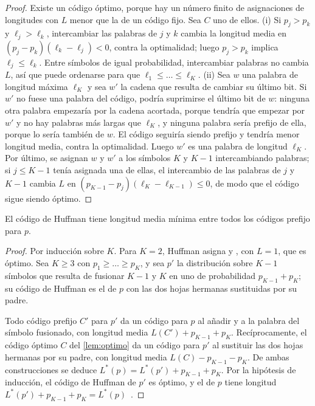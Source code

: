 \begin{proof}
Existe un código óptimo, porque hay un número finito de asignaciones de longitudes con $L$ menor que la de un código fijo. Sea $C$ uno de ellos. (i) Si $p_j>p_k$ y $\ell_j>\ell_k$, intercambiar las palabras de $j$ y $k$ cambia la longitud media en $(p_j-p_k)(\ell_k-\ell_j)<0$, contra la optimalidad; luego $p_j>p_k$ implica $\ell_j\le\ell_k$. Entre símbolos de igual probabilidad, intercambiar palabras no cambia $L$, así que puede ordenarse para que $\ell_1\le\dots\le\ell_K$. (ii) Sea $w$ una palabra de longitud máxima $\ell_K$ y sea $w'$ la cadena que resulta de cambiar su último bit. Si $w'$ no fuese una palabra del código, podría suprimirse el último bit de $w$: ninguna otra palabra empezaría por la cadena acortada, porque tendría que empezar por $w'$ y no hay palabras más largas que $\ell_K$, y ninguna palabra sería prefijo de ella, porque lo sería también de $w$. El código seguiría siendo prefijo y tendría menor longitud media, contra la optimalidad. Luego $w'$ es una palabra de longitud $\ell_K$. Por último, se asignan $w$ y $w'$ a los símbolos $K$ y $K-1$ intercambiando palabras; si $j\le K-1$ tenía asignada una de ellas, el intercambio de las palabras de $j$ y $K-1$ cambia $L$ en $(p_{K-1}-p_j)(\ell_K-\ell_{K-1})\le 0$, de modo que el código sigue siendo óptimo.
\end{proof}

\begin{teorema}\label{teo:huffman}
El código de Huffman tiene longitud media mínima entre todos los códigos prefijo para $p$.
\end{teorema}

\begin{proof}
Por inducción sobre $K$. Para $K=2$, Huffman asigna  y , con $L=1$, que es óptimo. Sea $K\ge 3$ con $p_1\ge\dots\ge p_K$, y sea $p'$ la distribución sobre $K-1$ símbolos que resulta de fusionar $K-1$ y $K$ en uno de probabilidad $p_{K-1}+p_K$; su código de Huffman es el de $p$ con las dos hojas hermanas sustituidas por su padre.

Todo código prefijo $C'$ para $p'$ da un código para $p$ al añadir  y  a la palabra del símbolo fusionado, con longitud media $L(C')+p_{K-1}+p_K$. Recíprocamente, el código óptimo $C$ del \cref{lem:optimo} da un código para $p'$ al sustituir las dos hojas hermanas por su padre, con longitud media $L(C)-p_{K-1}-p_K$. De ambas construcciones se deduce $L^{*}(p)=L^{*}(p')+p_{K-1}+p_K$. Por la hipótesis de inducción, el código de Huffman de $p'$ es óptimo, y el de $p$ tiene longitud $L^{*}(p')+p_{K-1}+p_K=L^{*}(p)$~\cite[§5.8]{ct}.
\end{proof}

